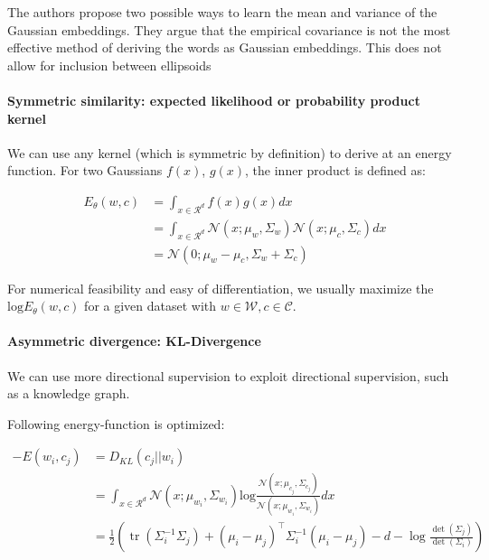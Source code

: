 \documentclass[a4paper,12pt,twoside,openright]{report}
\begin{document}
The authors propose two possible ways to learn the mean and variance of the Gaussian embeddings.
They argue that the empirical covariance is not the most effective method of deriving the words as Gaussian embeddings.
This does not allow for inclusion between ellipsoids 

\paragraph{Symmetric similarity: expected likelihood or probability product kernel}

We can use any kernel (which is symmetric by definition) to derive at an energy function.
For two Gaussians $f(x)$, $g(x)$, the inner product is defined as:

\begin{align}
E_\theta(w, c) &= \int_{x \in \mathcal{R}^d} f(x)g(x) dx \\
&= \int_{x \in \mathcal{R}^d} \mathcal{N}(x; \mu_w, \Sigma_w) \mathcal{N}(x; \mu_c, \Sigma_c) dx \\
&= \mathcal{N}(0; \mu_w - \mu_c, \Sigma_w + \Sigma_c)
\end{align}

For numerical feasibility and easy of differentiation, we usually maximize the $\text{log} E_\theta(w, c)$ for a given dataset with $w \in \mathcal{W}, c \in \mathcal{C}$.

\paragraph{Asymmetric divergence: KL-Divergence}

We can use more directional supervision to exploit directional supervision, such as a knowledge graph.

Following energy-function is optimized:

\begin{align}
-E(w_i, c_j) & = D_{KL}(c_j || w_i) \\
&= \int_{x \in \mathcal{R}^d} \mathcal{N}(x; \mu_{w_i}, \Sigma_{w_i}) \text{log} \frac{\mathcal{N}(x; \mu_{c_j}, \Sigma_{c_j})}{\mathcal{N}(x; \mu_{w_i}, \Sigma_{w_i})} dx \\
&= \frac{1}{2}\left(\operatorname{tr}\left(\Sigma_{i}^{-1} \Sigma_{j}\right)+\left(\mu_{i}-\mu_{j}\right)^{\top} \Sigma_{i}^{-1}\left(\mu_{i}-\mu_{j}\right)-d-\log \frac{\operatorname{det}\left(\Sigma_{j}\right)}{\operatorname{det}\left(\Sigma_{i}\right)}\right)
\end{align}
\end{document}
